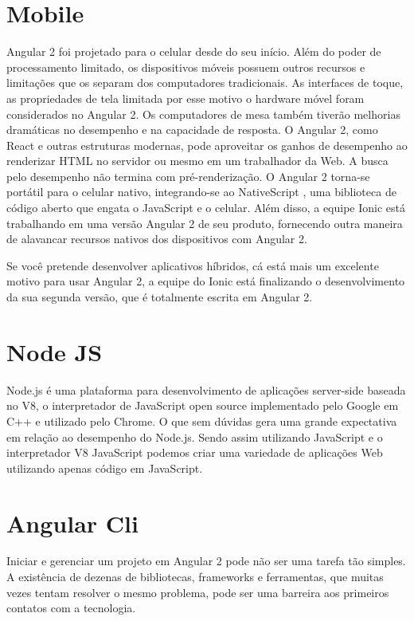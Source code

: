 \documentclass[12pt]{article}
\begin{document}
\section{Mobile}

Angular 2 foi projetado para o celular desde do seu início. Além do poder de processamento limitado, os dispositivos móveis possuem outros recursos e limitações que os separam dos computadores tradicionais. As interfaces de toque, as propriedades de tela limitada por esse motivo o hardware móvel foram considerados no Angular 2.
Os computadores de mesa também tiverão melhorias dramáticas no desempenho e na capacidade de resposta.
O Angular 2, como React e outras estruturas modernas, pode aproveitar os ganhos de desempenho ao renderizar HTML no servidor ou mesmo em um trabalhador da Web. A busca pelo desempenho não termina com pré-renderização. O Angular 2 torna-se portátil para o celular nativo, integrando-se ao NativeScript , uma biblioteca de código aberto que engata o JavaScript e o celular. Além disso, a equipe Ionic está trabalhando em uma versão Angular 2 de seu produto, fornecendo outra maneira de alavancar recursos nativos dos dispositivos com Angular 2.

Se você pretende desenvolver aplicativos híbridos, cá está mais um excelente motivo para usar Angular 2, a equipe do Ionic está finalizando o desenvolvimento da sua segunda versão, que é totalmente escrita em Angular 2.

\section{Node JS}
Node.js é uma plataforma para desenvolvimento de aplicações server-side baseada no V8, o interpretador de JavaScript open source implementado pelo Google em C++ e utilizado pelo Chrome. O que sem dúvidas gera uma grande expectativa em relação ao desempenho do Node.js. Sendo assim utilizando JavaScript e o interpretador V8 JavaScript podemos criar uma variedade de aplicações Web utilizando apenas código em JavaScript.


\section{Angular Cli}
Iniciar e gerenciar um projeto em Angular 2 pode não ser uma tarefa tão simples. A existência de dezenas de bibliotecas, frameworks e ferramentas, que muitas vezes tentam resolver o mesmo problema, pode ser uma barreira aos primeiros contatos com a tecnologia.
\end{document}
